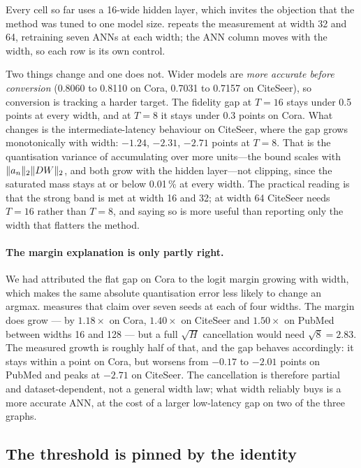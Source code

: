 Every cell so far uses a 16-wide hidden layer, which invites the objection that the method was tuned
to one model size.  repeats the measurement at width 32 and 64, retraining seven
ANNs at each width; the ANN column moves with the width, so each row is its own control.

Two things change and one does not. Wider models are \emph{more accurate before conversion}
(0.8060 to 0.8110 on Cora, 0.7031 to 0.7157 on CiteSeer), so conversion is tracking a harder target.
The fidelity gap at $T=16$ stays under 0.5 points at every width, and at $T=8$ it stays under 0.3
points on Cora. What changes is the intermediate-latency behaviour on CiteSeer, where the gap grows
monotonically with width: $-1.24$, $-2.31$, $-2.71$ points at $T=8$. That is the quantisation
variance of  accumulating over more units---the bound scales with
$\lVert a_{n}\rVert_{2}\lVert DW\rVert_{2}$, and both grow with the hidden layer---not clipping, since the saturated
mass stays at or below 0.01\,\% at every width. The practical reading is that the strong band is met
at width 16 and 32; at width 64 CiteSeer needs $T=16$ rather than $T=8$, and saying so is more useful
than reporting only the width that flatters the method.



\paragraph{The margin explanation is only partly right.} We had attributed the flat gap on Cora to
the logit margin growing with width, which makes the same absolute quantisation error less likely to
change an argmax.  measures that claim over seven seeds at each of four widths.
The margin does grow --- by $1.18\times$ on Cora, $1.40\times$ on CiteSeer and $1.50\times$ on
PubMed between widths 16 and 128 --- but a full $\sqrt{H}$ cancellation would need $\sqrt{8}=2.83$.
The measured growth is roughly half of that, and the gap behaves accordingly: it stays within a point
on Cora, but worsens from $-0.17$ to $-2.01$ points on PubMed and peaks at $-2.71$ on CiteSeer. The
cancellation is therefore partial and dataset-dependent, not a general width law; what width reliably
buys is a more accurate ANN, at the cost of a larger low-latency gap on two of the three graphs.

\subsection{The threshold is pinned by the identity}
\label{sec:threshold}

